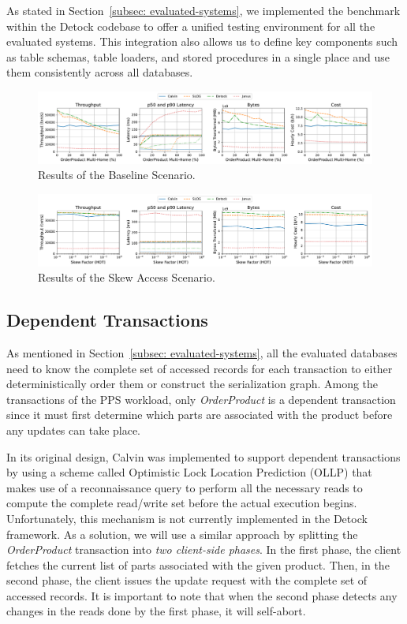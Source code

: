 As stated in Section~\ref{subsec: evaluated-systems}, we implemented the benchmark within the Detock codebase to offer a unified testing environment for all the evaluated systems. This integration also allows us to define key components such as table schemas, table loaders, and stored procedures in a single place and use them consistently across all databases.

\begin{figure}[t]
    \centering
    \includegraphics[width=1\textwidth]{figures/Baseline.pdf}
    \caption{Results of the Baseline Scenario.}
    \label{fig: baseline-scenario}
\end{figure}

\begin{figure}[t]
    \centering
    \includegraphics[width=1\textwidth]{figures/Skew.pdf}
    \caption{Results of the Skew Access Scenario.}
    \label{fig: skew-access-scenario}
\end{figure}

\subsection{Dependent Transactions}
\label{subsec: dependent-transactions}
As mentioned in Section~\ref{subsec: evaluated-systems}, all the evaluated databases need to know the complete set of accessed records for each transaction to either deterministically order them or construct the serialization graph. Among the transactions of the PPS workload, only \textit{OrderProduct} is a dependent transaction since it must first determine which parts are associated with the product before any updates can take place.

In its original design, Calvin was implemented to support dependent transactions by using a scheme called Optimistic Lock Location Prediction (OLLP) that makes use of a reconnaissance query to perform all the necessary reads to compute the complete read/write set before the actual execution begins. Unfortunately, this mechanism is not currently implemented in the Detock framework. As a solution, we will use a similar approach by splitting the \textit{OrderProduct} transaction into \textit{two client-side phases}. In the first phase, the client fetches the current list of parts associated with the given product. Then, in the second phase, the client issues the update request with the complete set of accessed records. It is important to note that when the second phase detects any changes in the reads done by the first phase, it will self-abort.

